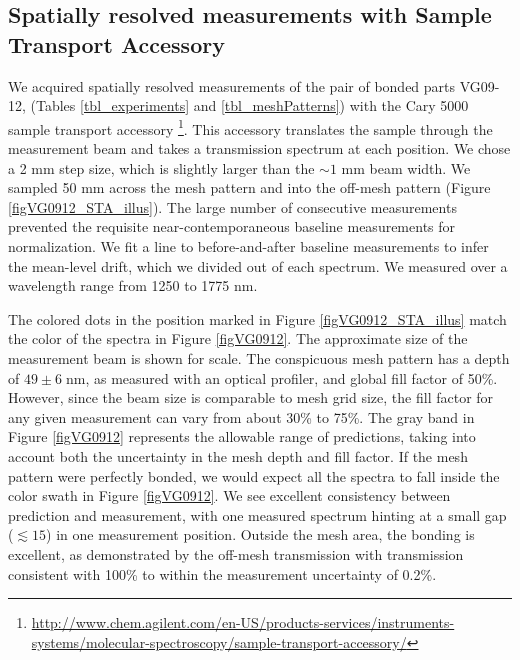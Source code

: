 \subsection{Spatially resolved measurements with Sample Transport Accessory}
We acquired spatially resolved measurements of the pair of bonded parts VG09-12, (Tables \ref{tbl_experiments} and \ref{tbl_meshPatterns}) with the Cary 5000 sample transport accessory \footnote{\url{http://www.chem.agilent.com/en-US/products-services/instruments-systems/molecular-spectroscopy/sample-transport-accessory/}}.  This accessory translates the sample through the measurement beam and takes a transmission spectrum at each position.  We chose a 2 mm step size, which is slightly larger than the $\sim1$ mm beam width.  We sampled 50 mm across the mesh pattern and into the off-mesh pattern (Figure \ref{figVG0912_STA_illus}).  The large number of consecutive measurements prevented the requisite near-contemporaneous baseline measurements for normalization.  We fit a line to before-and-after baseline measurements to infer the mean-level drift, which we divided out of each spectrum.  We measured over a wavelength range from 1250 to 1775 nm.

The colored dots in the position marked in Figure \ref{figVG0912_STA_illus} match the color of the spectra in Figure \ref{figVG0912}.  The approximate size of the measurement beam is shown for scale.  The conspicuous mesh pattern has a depth of $49\pm6\;$nm, as measured with an optical profiler, and global fill factor of 50\%.  However, since the beam size is comparable to mesh grid size, the fill factor for any given measurement can vary from about 30\% to 75\%.  The gray band in Figure \ref{figVG0912} represents the allowable range of predictions, taking into account both the uncertainty in the mesh depth and fill factor.  If the mesh pattern were perfectly bonded, we would expect all the spectra to fall inside the color swath in Figure \ref{figVG0912}.  We see excellent consistency between prediction and measurement, with one measured spectrum hinting at a small gap ($\lesssim15$) in one measurement position.  Outside the mesh area, the bonding is excellent, as demonstrated by the off-mesh transmission with transmission consistent with 100\% to within the measurement uncertainty of 0.2\%.



